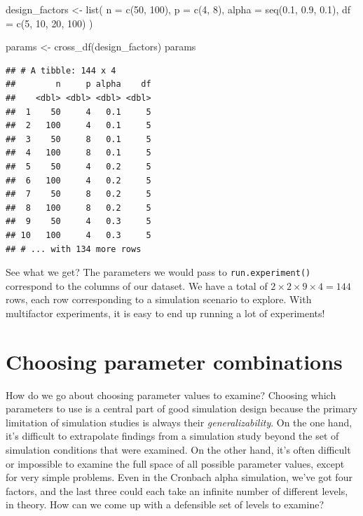 \documentclass[
]{book}
\newenvironment{Shaded}{\begin{snugshade}}{\end{snugshade}}
\newcommand{\AttributeTok}[1]{\textcolor[rgb]{0.77,0.63,0.00}{#1}}
\newcommand{\DecValTok}[1]{\textcolor[rgb]{0.00,0.00,0.81}{#1}}
\newcommand{\FloatTok}[1]{\textcolor[rgb]{0.00,0.00,0.81}{#1}}
\newcommand{\FunctionTok}[1]{\textcolor[rgb]{0.00,0.00,0.00}{#1}}
\newcommand{\NormalTok}[1]{#1}
\newcommand{\OtherTok}[1]{\textcolor[rgb]{0.56,0.35,0.01}{#1}}
\begin{document}
\begin{Shaded}
\begin{Highlighting}[]
\NormalTok{design\_factors }\OtherTok{\textless{}{-}} \FunctionTok{list}\NormalTok{(}
  \AttributeTok{n =} \FunctionTok{c}\NormalTok{(}\DecValTok{50}\NormalTok{, }\DecValTok{100}\NormalTok{),}
  \AttributeTok{p =} \FunctionTok{c}\NormalTok{(}\DecValTok{4}\NormalTok{, }\DecValTok{8}\NormalTok{),}
  \AttributeTok{alpha =} \FunctionTok{seq}\NormalTok{(}\FloatTok{0.1}\NormalTok{, }\FloatTok{0.9}\NormalTok{, }\FloatTok{0.1}\NormalTok{),}
  \AttributeTok{df =} \FunctionTok{c}\NormalTok{(}\DecValTok{5}\NormalTok{, }\DecValTok{10}\NormalTok{, }\DecValTok{20}\NormalTok{, }\DecValTok{100}\NormalTok{)}
\NormalTok{)}

\NormalTok{params }\OtherTok{\textless{}{-}} \FunctionTok{cross\_df}\NormalTok{(design\_factors)}
\NormalTok{params}
\end{Highlighting}
\end{Shaded}

\begin{verbatim}
## # A tibble: 144 x 4
##        n     p alpha    df
##    <dbl> <dbl> <dbl> <dbl>
##  1    50     4   0.1     5
##  2   100     4   0.1     5
##  3    50     8   0.1     5
##  4   100     8   0.1     5
##  5    50     4   0.2     5
##  6   100     4   0.2     5
##  7    50     8   0.2     5
##  8   100     8   0.2     5
##  9    50     4   0.3     5
## 10   100     4   0.3     5
## # ... with 134 more rows
\end{verbatim}

See what we get?
The parameters we would pass to \texttt{run.experiment()} correspond to the
columns of our dataset.
We have a total of \(2 \times 2 \times 9 \times 4 = 144\) rows, each row corresponding to a simulation scenario to explore.
With multifactor experiments, it is easy to end up running a lot of experiments!

\hypertarget{choosing-parameter-combinations}{%
\section{Choosing parameter combinations}\label{choosing-parameter-combinations}}

How do we go about choosing parameter values to examine?
Choosing which parameters to use is a central part of good simulation design because the primary limitation of simulation studies is always their \emph{generalizability}.
On the one hand, it's difficult to extrapolate findings from a simulation study beyond the set of simulation conditions that were examined. On the other hand, it's often difficult or impossible to examine the full space of all possible parameter values, except for very simple problems. Even in the Cronbach alpha simulation, we've got four factors, and the last three could each take an infinite number of different levels, in theory. How can we come up with a defensible set of levels to examine?
\end{document}
